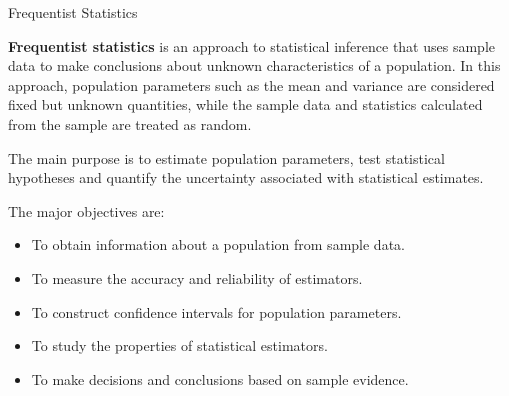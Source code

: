\documentclass[aspectratio=169]{beamer}
\begin{document}
\newpage
\begin{frame}{Frequentist Statistics}


\textbf{Frequentist statistics} is an approach to statistical inference that uses sample data to make conclusions about unknown characteristics of a population. In this approach, population parameters such as the mean and variance are considered fixed but unknown quantities, while the sample data and statistics calculated from the sample are treated as random.
\item The main purpose is to estimate population parameters, test statistical hypotheses and quantify the uncertainty associated with statistical estimates.  
\item The major objectives are: \begin{itemize} 
\item To obtain information about a population from sample data. 
\item To measure the accuracy and reliability of estimators. 
\item To construct confidence intervals for population parameters. 
\item To study the properties of statistical estimators.
\item To make decisions and conclusions based on sample evidence. \end{itemize}
\end{frame}
\end{document}
